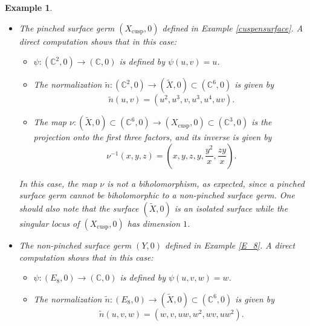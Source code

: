 \documentclass[reqno,dvipsnames,12pt]{amsart}
\newtheorem{exam}[thm]{Example}
\begin{document}
\begin{exam}
\begin{itemize}
\begin{itemize}
    \item The map 
    $
    \nu : (\widetilde{X},0)\subset (\mathbb{C}^6,0) \longrightarrow (X_{\mathrm{WC}},0)\subset (\mathbb{C}^3,0)
    $
    is the projection onto the first three factors, and its inverse is given by
    $$
    \nu^{-1}(x,y,z)=\left(x,y,z,\frac{x^2}{zy^2},\frac{xy}{zy^2},\frac{x}{y^2}\right).
    $$
\end{itemize}

In this case as well, the map $\nu$ is not a biholomorphism, which is consistent with the fact that a pinched surface germ cannot be biholomorphic to a non-pinched one.
\item The pinched surface germ $(X_{\mathrm{cusp}},0)$ defined in Example \ref{cuspensurface}. A direct computation shows that in this case:

\begin{itemize}
    \item $\psi : (\mathbb{C}^2,0) \longrightarrow (\mathbb{C},0)$ is defined by $\psi(u,v)=u$.
    
    \item The normalization 
    $
    \widetilde{n} : (\mathbb{C}^2,0) \longrightarrow (\widetilde{X},0)\subset (\mathbb{C}^6,0)
    $
    is given by
    $$
    \widetilde{n}(u,v)=(u^2,u^3,v,u^3,u^4,uv).
    $$
    
    \item The map 
    $
    \nu : (\widetilde{X},0)\subset (\mathbb{C}^6,0) \longrightarrow(X_{\mathrm{cusp}},0)\subset (\mathbb{C}^3,0)
    $
    is the projection onto the first three factors, and its inverse is given by
    $$
    \nu^{-1}(x,y,z)=\left(x,y,z,y,\frac{y^2}{x},\frac{zy}{x}\right).
    $$
\end{itemize}

In this case, the map $\nu$ is not a biholomorphism, as expected, since a pinched surface germ cannot be biholomorphic to a non-pinched surface germ. One should also note that the surface $(\widetilde{X},0)$ is an isolated surface  while the singular locus of $(X_{\mathrm{cusp}},0)$ has dimension $1$.
\item The non-pinched surface germ $(Y,0)$ defined in Example \ref{E_8}. A direct computation shows that in this case:

\begin{itemize}
    \item $\psi : (E_8,0) \longrightarrow (\mathbb{C},0)$ is defined by $\psi(u,v,w)=w$.
    
    \item The normalization 
    $
    \widetilde{n} : (E_8,0) \longrightarrow (\widetilde{X},0)\subset (\mathbb{C}^6,0)
    $
    is given by
    $$
    \widetilde{n}(u,v,w)=(w,v,uw,w^2,wv,uw^2).
    $$
    

\end{itemize}
\end{itemize}
\end{exam}
\end{document}
